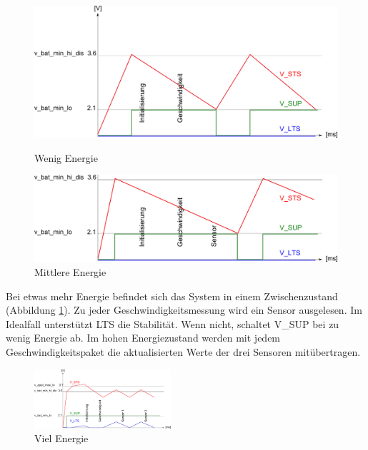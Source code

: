 \begin{figure}[ht]
    \begin{minipage}[t]{0.5\textwidth}
      \includegraphics[width=1.0\textwidth]{3Vorgehen/imag/LOW_ENERGY.png}
      \caption{Wenig Energie}
      \label{LOW_ENER}
    \end{minipage}
    \begin{minipage}[t]{0.5\textwidth}
      \includegraphics[width=1.0\textwidth]{3Vorgehen/imag/MIDDLE_ENERGY.png}
      \caption{Mittlere Energie}
      \label{MID_ENER}
    \end{minipage}
\end{figure}

Bei etwas mehr Energie befindet sich das System in einem Zwischenzustand (Abbildung \ref{MID_ENER}). Zu jeder Geschwindigkeitsmessung wird ein Sensor ausgelesen. Im Idealfall unterstützt LTS die Stabilität. Wenn nicht, schaltet V\_SUP bei zu wenig Energie ab. Im hohen Energiezustand werden mit jedem Geschwindigkeitspaket die aktualisierten Werte der drei Sensoren mitübertragen. 

\begin{figure}[ht]
  \includegraphics[width=0.45\textwidth]{3Vorgehen/imag/HIGH_ENERGY.png}
  \caption{Viel Energie}
  \label{HIGH_ENER}
\end{figure}


